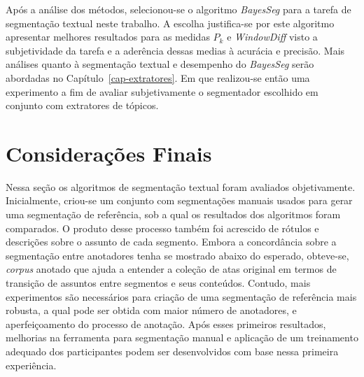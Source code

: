Após a análise dos métodos, selecionou-se o algoritmo \textit{BayesSeg} para a tarefa de segmentação textual neste trabalho. 
A escolha justifica-se por este algoritmo apresentar melhores resultados para as medidas $P_k$ e \textit{WindowDiff} visto a subjetividade da tarefa e a aderência dessas medias à acurácia e precisão. Mais análises quanto à segmentação textual e desempenho do \textit{BayesSeg} serão abordadas no Capítulo~\ref{cap-extratores}. Em que realizou-se então uma experimento a fim de avaliar subjetivamente o segmentador escolhido em conjunto com extratores de tópicos.







\section{Considerações Finais}



Nessa seção os algoritmos de segmentação textual foram avaliados objetivamente. 
Inicialmente, criou-se um conjunto com segmentações manuais usados para gerar uma segmentação de referência, sob a qual os resultados dos algoritmos foram comparados. O produto  desse processo também foi acrescido de rótulos e descrições sobre o assunto de cada segmento.
Embora a concordância sobre a segmentação entre anotadores tenha se mostrado abaixo do esperado, obteve-se, \textit{corpus} anotado que ajuda a entender a coleção de atas original em termos de transição de assuntos entre segmentos e seus conteúdos.
Contudo, mais experimentos são necessários para criação de uma segmentação de referência mais robusta, a qual pode ser obtida com maior número de anotadores, e aperfeiçoamento do processo de anotação. Após esses primeiros resultados, melhorias na ferramenta para segmentação manual e aplicação de um treinamento adequado dos participantes podem ser desenvolvidos com base nessa primeira experiência.

